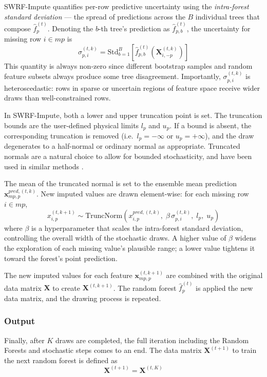 \documentclass[preprint,longauthor,twocolumn]{aastex631}
\begin{document}
SWRF-Impute quantifies per-row predictive uncertainty using the \textit{intra-forest standard deviation} --- the spread of predictions across the $B$ individual trees that compose $\hat{f}^{(t)}_p$. Denoting the $b$-th tree's prediction as $\hat{f}^{(t)}_{p,b}$, the uncertainty for missing row $i \in mp$ is
\begin{equation}
  \sigma^{(t,k)}_{p,i} = \text{Std}_{b=1}^{B}\!\left[\hat{f}^{(t)}_{p,b}\!\left(\mathbf{X}^{(t,k)}_{i,-p}\right)\right]
\end{equation}
This quantity is always non-zero since different bootstrap samples and random feature subsets always produce some tree disagreement. Importantly, $\sigma^{(t,k)}_{p,i}$ is heteroscedastic: rows in sparse or uncertain regions of feature space receive wider draws than well-constrained rows.

In SWRF-Impute, both a lower and upper truncation point is set. The truncation bounds are the user-defined physical limits $l_p$ and $u_p$. If a bound is absent, the corresponding truncation is removed (i.e.\ $l_p = -\infty$ or $u_p = +\infty$), and the draw degenerates to a half-normal or ordinary normal as appropriate. Truncated normals are a natural choice to allow for bounded stochasticity, and have been used in similar methods \citep{weiGSimpGibbsSampler2018,wangImprovedGSimpFlexible2023}.

The mean of the truncated normal is set to the ensemble mean prediction $\mathbf{x}^{pred,(t,k)}_{mp,p}$. New imputed values are drawn element-wise: for each missing row $i \in mp$,
\begin{equation}
  x^{(t,k+1)}_{i,p} \sim \text{TruncNorm}\!\left(x^{pred,(t,k)}_{i,p},\; \beta\,\sigma^{(t,k)}_{p,i},\; l_p,\; u_p\right)
\end{equation}
where $\beta$ is a hyperparameter that scales the intra-forest standard deviation, controlling the overall width of the stochastic draws. A higher value of $\beta$ widens the exploration of each missing value's plausible range; a lower value tightens it toward the forest's point prediction.

The new imputed values for each feature $\mathbf{x}^{(t,k+1)}_{mp,p}$ are combined with the original data matrix $\mathbf{X}$ to create $\mathbf{X}^{(t,k+1)}$. The random forest $\hat{f}^{(t)}_p$ is applied the new data matrix, and the drawing process is repeated.

\subsubsection{Output}
Finally, after $K$ draws are completed, the full iteration including the Random Forests and stochastic steps comes to an end. The data matrix $\mathbf{X}^{(t+1)}$ to train the next random forest is defined as
\begin{equation}
  \mathbf{X}^{(t+1)} = \mathbf{X}^{(t,K)}
\end{equation}
\end{document}
